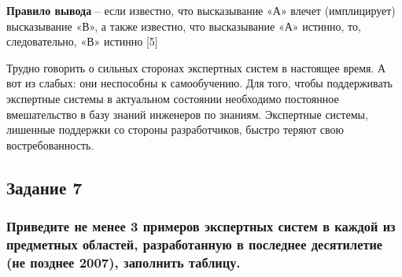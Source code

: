 \documentclass[14pt,a4paper,report]{report}
\begin{document}
\textbf{Правило вывода} -- если известно, что высказывание «А» влечет (имплицирует) высказывание «В», а также известно, что высказывание «А» истинно, то, следовательно, «В» истинно [5]

Трудно говорить о сильных сторонах экспертных систем в настоящее время. А вот из слабых: они неспособны к самообучению. Для того, чтобы поддерживать экспертные системы в актуальном состоянии необходимо постоянное вмешательство в базу знаний инженеров по знаниям. Экспертные системы, лишенные поддержки со стороны разработчиков, быстро теряют свою востребованность.


\clearpage

\subsection{Задание 7}

\subsubsection{Приведите не менее 3 примеров экспертных систем в каждой из предметных областей, разработанную в последнее десятилетие (не позднее 2007), заполнить таблицу.}
\end{document}
